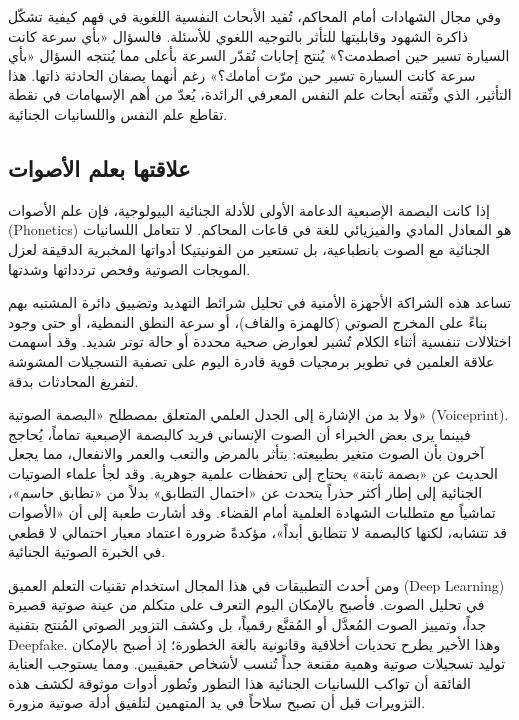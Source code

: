 وفي مجال الشهادات أمام المحاكم، تُفيد الأبحاث النفسية اللغوية في فهم كيفية تشكّل ذاكرة الشهود وقابليتها للتأثر بالتوجيه اللغوي للأسئلة. فالسؤال «بأي سرعة كانت السيارة تسير حين اصطدمت؟» يُنتج إجابات تُقدّر السرعة بأعلى مما يُنتجه السؤال «بأي سرعة كانت السيارة تسير حين مرّت أمامك؟» رغم أنهما يصفان الحادثة ذاتها. هذا التأثير، الذي وثّقته أبحاث علم النفس المعرفي الرائدة، يُعدّ من أهم الإسهامات في نقطة تقاطع علم النفس واللسانيات الجنائية.

\subsection{علاقتها بعلم الأصوات}

إذا كانت البصمة الإصبعية الدعامة الأولى للأدلة الجنائية البيولوجية، فإن علم الأصوات (\textenglish{Phonetics}) هو المعادل المادي والفيزيائي للغة في قاعات المحاكم. لا تتعامل اللسانيات الجنائية مع الصوت بانطباعية، بل تستعير من الفونيتيكا أدواتها المخبرية الدقيقة لعزل المويجات الصوتية وفحص تردداتها وشدتها.

تساعد هذه الشراكة الأجهزة الأمنية في تحليل شرائط التهديد وتضييق دائرة المشتبه بهم بناءً على المخرج الصوتي (كالهمزة والقاف)، أو سرعة النطق النمطية، أو حتى وجود اختلالات تنفسية أثناء الكلام تُشير لعوارض صحية محددة أو حالة توتر شديد. وقد أسهمت علاقة العلمين في تطوير برمجيات قوية قادرة اليوم على تصفية التسجيلات المشوشة لتفريغ المحادثات بدقة\autocite[12]{alhafi2023}.

ولا بد من الإشارة إلى الجدل العلمي المتعلق بمصطلح «البصمة الصوتية» (\textenglish{Voiceprint}). فبينما يرى بعض الخبراء أن الصوت الإنساني فريد كالبصمة الإصبعية تماماً، يُحاجج آخرون بأن الصوت متغير بطبيعته: يتأثر بالمرض والتعب والعمر والانفعال، مما يجعل الحديث عن «بصمة ثابتة» يحتاج إلى تحفظات علمية جوهرية. وقد لجأ علماء الصوتيات الجنائية إلى إطار أكثر حذراً يتحدث عن «احتمال التطابق» بدلاً من «تطابق حاسم»، تماشياً مع متطلبات الشهادة العلمية أمام القضاء. وقد أشارت طعبة إلى أن «الأصوات قد تتشابه، لكنها كالبصمة لا تتطابق أبداً»، مؤكدةً ضرورة اعتماد معيار احتمالي لا قطعي في الخبرة الصوتية الجنائية\autocite[57]{taaba2022}.

ومن أحدث التطبيقات في هذا المجال استخدام تقنيات التعلم العميق (\textenglish{Deep Learning}) في تحليل الصوت. فأصبح بالإمكان اليوم التعرف على متكلم من عينة صوتية قصيرة جداً، وتمييز الصوت المُعدَّل أو المُقنَّع رقمياً، بل وكشف التزوير الصوتي المُنتج بتقنية \textenglish{Deepfake}. وهذا الأخير يطرح تحديات أخلاقية وقانونية بالغة الخطورة؛ إذ أصبح بالإمكان توليد تسجيلات صوتية وهمية مقنعة جداً تُنسب لأشخاص حقيقيين. ومما يستوجب العناية الفائقة أن تواكب اللسانيات الجنائية هذا التطور وتُطور أدوات موثوقة لكشف هذه التزويرات قبل أن تصبح سلاحاً في يد المتهمين لتلفيق أدلة صوتية مزورة.



